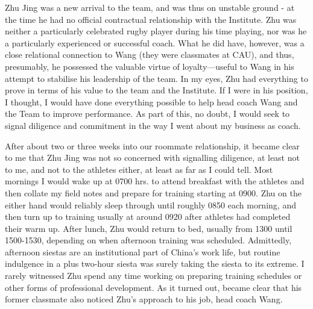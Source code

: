 \begin{CJK}{UTF8}{gbsn}
  Zhu Jing was a new arrival to the team, and was thus on unstable ground - at the time he had no official contractual relationship with the Institute.  Zhu was neither a particularly celebrated rugby player during his time playing, nor was he a particularly experienced or successful coach.  What he did have, however, was a close relational connection to Wang (they were classmates at CAU), and thus, presumably, he possessed the valuable virtue of loyalty---useful to Wang in his attempt to stabilise his leadership of the team.  In my eyes, Zhu had everything to prove in terms of his value to the team and the Institute.  If I were in his position, I thought, I would have done everything possible to help head coach Wang and the Team to improve performance.  As part of this, no doubt, I would seek to signal diligence and commitment in the way I went about my business as coach.

  After about two or three weeks into our roommate relationship, it became clear to me that Zhu Jing was not so concerned with signalling diligence, at least not to me, and not to the athletes either, at least as far as I could tell.  Most mornings I would wake up at 0700 hrs. to attend breakfast with the athletes and then collate my field notes and prepare for training starting at 0900. Zhu on the either hand would reliably sleep through until roughly 0850 each morning, and then turn up to training usually at around 0920 after athletes had completed their warm up.  After lunch, Zhu would return to bed, usually from 1300 until 1500-1530, depending on when afternoon training was scheduled. Admittedly, afternoon siestas are an institutional part of China's work life, but routine indulgence in a plus two-hour siesta was surely taking the siesta to its extreme.  I rarely witnessed Zhu spend any time working on preparing training schedules or other forms of professional development.  As it turned out, became clear that his former classmate also noticed Zhu's approach to his job, head coach Wang.


\end{CJK}
